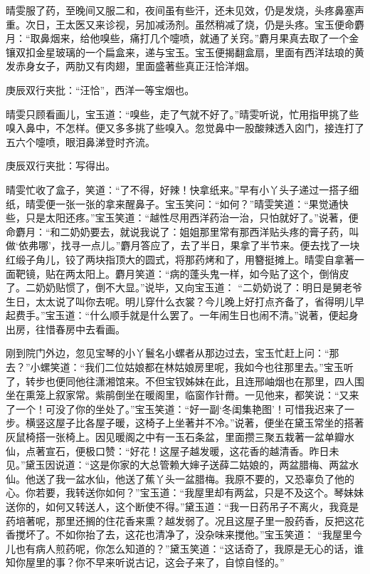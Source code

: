 \begin{parag}


    晴雯服了药，至晚间又服二和，夜间虽有些汗，还未见效，仍是发烧，头疼鼻塞声重。次日，王太医又来诊视，另加减汤剂。虽然稍减了烧，仍是头疼。宝玉便命麝月：“取鼻烟来，给他嗅些，痛打几个嚏喷，就通了关窍。”麝月果真去取了一个金镶双扣金星玻璃的一个扁盒来，递与宝玉。宝玉便揭翻盒扇，里面有西洋珐琅的黄发赤身女子，两肋又有肉翅，里面盛著些真正汪恰洋烟。\begin{note}庚辰双行夹批：“汪恰”，西洋一等宝烟也。\end{note}晴雯只顾看画儿，宝玉道：“嗅些，走了气就不好了。”晴雯听说，忙用指甲挑了些嗅入鼻中，不怎样。便又多多挑了些嗅入。忽觉鼻中一股酸辣透入囟门，接连打了五六个嚏喷，眼泪鼻涕登时齐流。\begin{note}庚辰双行夹批：写得出。\end{note}晴雯忙收了盒子，笑道：“了不得，好辣！快拿纸来。”早有小丫头子递过一搭子细纸，晴雯便一张一张的拿来醒鼻子。宝玉笑问：“如何？”晴雯笑道：“果觉通快些，只是太阳还疼。”宝玉笑道：“越性尽用西洋药治一治，只怕就好了。”说著，便命麝月：“和二奶奶要去，就说我说了：姐姐那里常有那西洋贴头疼的膏子药，叫做‘依弗哪’，找寻一点儿。”麝月答应了，去了半日，果拿了半节来。便去找了一块红缎子角儿，铰了两块指顶大的圆式，将那药烤和了，用簪挺摊上。晴雯自拿著一面靶镜，贴在两太阳上。麝月笑道：“病的蓬头鬼一样，如今贴了这个，倒俏皮了。二奶奶贴惯了，倒不大显。”说毕，又向宝玉道： “二奶奶说了：明日是舅老爷生日，太太说了叫你去呢。明儿穿什么衣裳？今儿晚上好打点齐备了，省得明儿早起费手。”宝玉道：“什么顺手就是什么罢了。一年闹生日也闹不清。”说著，便起身出房，往惜春房中去看画。
\end{parag}


\begin{parag}


    刚到院门外边，忽见宝琴的小丫鬟名小螺者从那边过去，宝玉忙赶上问：“那去？”小螺笑道：“我们二位姑娘都在林姑娘房里呢，我如今也往那里去。”宝玉听了，转步也便同他往潇湘馆来。不但宝钗姊妹在此，且连邢岫烟也在那里，四人围坐在熏笼上叙家常。紫鹃倒坐在暖阁里，临窗作针黹。一见他来，都笑说：“又来了一个！可没了你的坐处了。”宝玉笑道：“好一副‘冬闺集艳图’！可惜我迟来了一步。横竖这屋子比各屋子暖，这椅子上坐著并不冷。”说著，便坐在黛玉常坐的搭著灰鼠椅搭一张椅上。因见暖阁之中有一玉石条盆，里面攒三聚五栽著一盆单瓣水仙，点著宣石，便极口赞：“好花！这屋子越发暖，这花香的越清香。昨日未见。”黛玉因说道：“这是你家的大总管赖大婶子送薛二姑娘的，两盆腊梅、两盆水仙。他送了我一盆水仙，他送了蕉丫头一盆腊梅。我原不要的，又恐辜负了他的心。你若要，我转送你如何？”宝玉道：“我屋里却有两盆，只是不及这个。琴妹妹送你的，如何又转送人，这个断使不得。”黛玉道：“我一日药吊子不离火，我竟是药培著呢，那里还搁的住花香来熏？越发弱了。况且这屋子里一股药香，反把这花香搅坏了。不如你抬了去，这花也清净了，没杂味来搅他。”宝玉笑道： “我屋里今儿也有病人煎药呢，你怎么知道的？”黛玉笑道：“这话奇了，我原是无心的话，谁知你屋里的事？你不早来听说古记，这会子来了，自惊自怪的。”
\end{parag}


